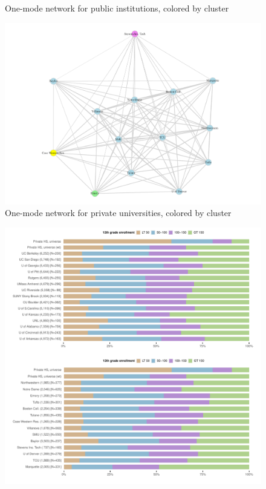 \documentclass[
]{article}
\begin{document}
\begin{landscape}
\begin{figure}
\caption{One-mode network for public institutions, colored by cluster}\label{fig:plot-1mode-pubu}
\end{figure}

\begin{figure}

{\centering \includegraphics[width=2\linewidth]{../assets/figures/plot_1mode_privu} 

}

\caption{One-mode network for private universities, colored by cluster}\label{fig:plot-1mode-privu}
\end{figure}

\newpage


\begin{figure}

{\centering \includegraphics[width=2\linewidth]{../assets/figures/ego_network_enroll_pubu_privu} 

}
\end{figure}
\end{landscape}
\end{document}
